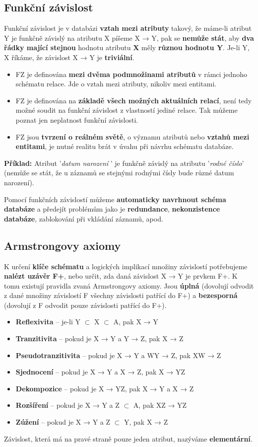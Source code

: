\subsection{Funkční závislost}
Funkční závislost je v databázi \textbf{vztah mezi atributy} takový, že máme-li atribut Y je funkčně závislý na atributu X píšeme X → Y, pak se \textbf{nemůže stát}, aby \textbf{dva řádky mající stejnou} hodnotu atributu \textbf{X} měly \textbf{různou hodnotu Y}. Je-li Y, X říkáme, že závislost X → Y je \textbf{triviální}.
\begin{itemize}
\item FZ je definována \textbf{mezi dvěma podmnožinami atributů} v rámci jednoho schématu relace. Jde o vztah mezi atributy, nikoliv mezi entitami.
\item FZ je definována na \textbf{základě všech možných aktuálních relací}, není tedy možné soudit na funkční závislost z vlastností jediné relace. Tak můžeme poznat jen neplatnost funkční závislosti.
\item FZ jsou \textbf{tvrzení o reálném světě}, o významu atributů nebo \textbf{vztahů mezi entitami}, je nutné realitu brát v úvahu při návrhu schématu databáze.
\end{itemize}

\textbf{Příklad:} Atribut '\textit{datum narození }' je funkčně závislý na atributu '\textit{rodné číslo}' (nemůže se stát, že u záznamů se stejnými rodnými čísly bude různé datum narození).

Pomocí funkčních závislostí můžeme\textbf{ automaticky navrhnout schéma databáze} a předejít problémům jako je \textbf{redundance}, \textbf{nekonzistence databáze}, zablokování při vkládání záznamů, apod.

\subsection{Armstrongovy axiomy}
K určení \textbf{klíče schématu} a logických implikací množiny závislostí potřebujeme \textbf{nalézt uzávěr F+}, nebo určit, zda daná závislost X → Y je prvkem F+.  K tomu existují pravidla zvaná Armstrongovy axiomy. Jsou \textbf{úplná} (dovolují odvodit z dané množiny závislostí F všechny závislosti patřící do F+) a \textbf{bezesporná} (dovolují z F odvodit pouze závislosti patřící do F+).
\begin{itemize}
\item \textbf{Reflexivita} -- je-li Y $\subset$ X $\subset$ A, pak X → Y
\item \textbf{Tranzitivita} -- pokud je X → Y a Y → Z, pak X → Z
\item \textbf{Pseudotranzitivita} --  pokud je X → Y a WY → Z, pak XW → Z
\item \textbf{Sjednocení} -- pokud je X → Y a X → Z, pak X  → YZ
\item \textbf{Dekompozice} -- pokud je X → YZ, pak  X  → Y a X → Z
\item \textbf{Rozšíření} --  pokud je X → Y a  Z $\subset$ A, pak  XZ  → YZ
\item \textbf{Zúžení} --  pokud je X → Y a  Z  $\subset$ Y, pak  X → Z
\end{itemize}
Závislost, která má na pravé straně pouze jeden atribut, nazýváme \textbf{elementární}. 

